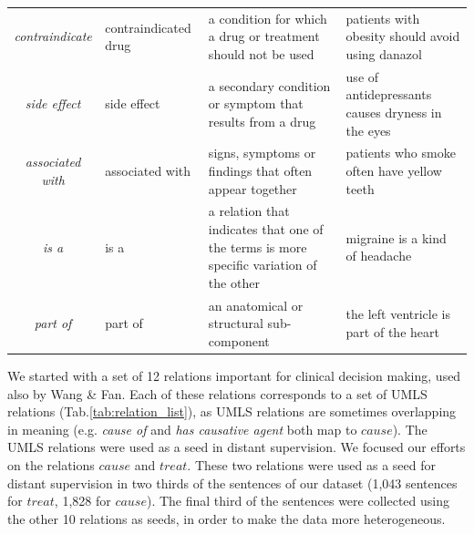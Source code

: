 \begin{table}[hbt!]
\begin{center}
{\begin{tabular}{cp{3.25cm}p{4.25cm}p{3.75cm}}
\cellcolor{aliceblue}\textit{contraindicate} & \cellcolor{aliceblue}contraindicated drug & \cellcolor{aliceblue}a condition for which a drug or treatment should not be used &  \cellcolor{aliceblue}patients with obesity should avoid using danazol \\  %

\textit{side effect} & side effect & a secondary condition or symptom that results from a drug %
&  use of antidepressants causes dryness in the eyes \\  %

\cellcolor{aliceblue}\textit{associated with} & \cellcolor{aliceblue}associated with & \cellcolor{aliceblue}signs, symptoms or findings that often appear together &  \cellcolor{aliceblue}patients who smoke often have yellow teeth \\  %

\textit{is a} & is a & a relation that indicates that one of the terms is more specific variation of the other &  migraine is a kind of headache \\  %

\cellcolor{aliceblue}\textit{part of} & \cellcolor{aliceblue}part of & \cellcolor{aliceblue}an anatomical or structural sub-component &  \cellcolor{aliceblue}the left ventricle is part of the heart \\  %
\bottomrule
\end{tabular}
}
\end{center}
\end{table}

We started with a set of 12 relations important for clinical decision making, used also by Wang \& Fan. Each of these relations corresponds to a set of UMLS relations (Tab.\ref{tab:relation_list}), as UMLS relations are sometimes overlapping in meaning (e.g. \textit{cause of} and \textit{has causative agent} both map to $cause$). The UMLS relations were used as a seed in distant supervision. We focused our efforts on the relations $cause$ and $treat$. These two relations were used as a seed for distant supervision in two thirds of the sentences of our dataset (1,043 sentences for $treat$, 1,828 for $cause$). The final third of the sentences were collected using the other 10 relations as seeds, in order to make the data more heterogeneous.


